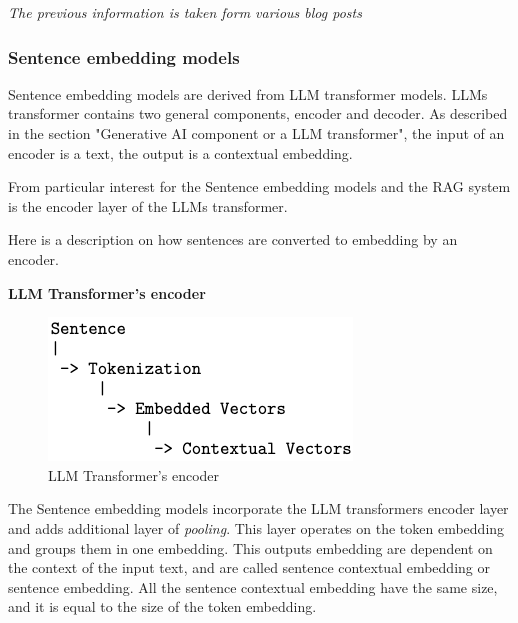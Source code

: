 \documentclass{wseas}
\begin{document}
\emph{The previous information is taken form various blog posts} \cite{website_MediumGuideonRAGDatabases} \cite{Website_CloudflareGuideonVectorInsertion}\cite{website_AporiaGuideonVectorDatabasesforRAG} 
\cite{website_DatabricksGlossaryonRAG} \cite{website_MongoDBAtlasCLIDocumentation}\cite{website_MediumGuideonRAGwithAtlas} \cite{website_Neo4jBlogOnLangchainVectorIndex} \cite{website_PondhouseGuideOnAdvancedRAG}

\subsubsection{Sentence embedding models}

Sentence embedding models are derived from LLM transformer models. LLMs
transformer contains two general components, encoder and decoder. As
described in the section "Generative AI component or a LLM
transformer", the input of an encoder is a text, the output is a
contextual embedding.

From particular interest for the Sentence embedding models and the RAG
system is the encoder layer of the LLMs transformer.

Here is a description on how sentences are converted to embedding by an
encoder.

\textbf{LLM Transformer's encoder}

\begin{figure}[htbp]{}
  \centering
  \includegraphics[width=\linewidth]{resources/v1/transformerEncoder.png}
  \caption{LLM Transformer's encoder}
  \label{fig:encoder_layer_figure}
\end{figure}

The Sentence embedding models incorporate the LLM transformers encoder
layer and adds additional layer of \emph{pooling}. This layer operates
on the token embedding and groups them in one embedding. This outputs
embedding are dependent on the context of the input text, and are called
sentence contextual embedding or sentence embedding. All the sentence
contextual embedding have the same size, and it is equal to the size of
the token embedding.
\end{document}
